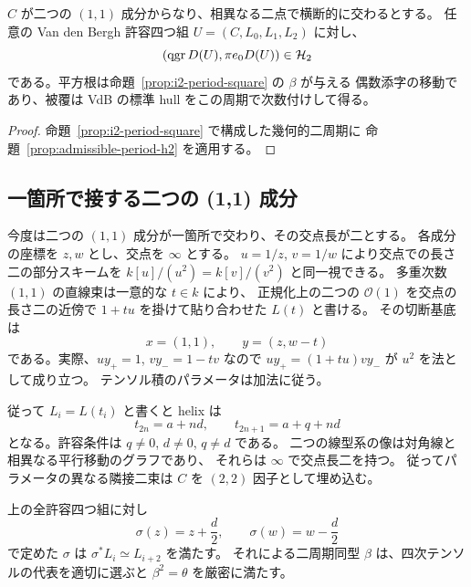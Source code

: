\begin{theorem}[横断的二成分境界での逆構成]
\label{thm:i2-inverse}
$C$ が二つの $(1,1)$ 成分からなり、相異なる二点で横断的に交わるとする。
任意の Van den Bergh 許容四つ組 $U=(C,L_0,L_1,L_2)$ に対し、
\[
  (\operatorname{qgr} D(U),\pi e_0D(U))\in\mathcal H_2
\]
である。平方根は命題~\ref{prop:i2-period-square} の $\beta$ が与える
偶数添字の移動であり、被覆は VdB の標準 hull をこの周期で次数付けして得る。
\end{theorem}

\begin{proof}
命題~\ref{prop:i2-period-square} で構成した幾何的二周期に
命題~\ref{prop:admissible-period-h2} を適用する。
\end{proof}

\subsection{一箇所で接する二つの (1,1) 成分}

今度は二つの $(1,1)$ 成分が一箇所で交わり、その交点長が二とする。
各成分の座標を $z,w$ とし、交点を $\infty$ とする。
$u=1/z$, $v=1/w$ により交点での長さ二の部分スキームを
$k[u]/(u^2)=k[v]/(v^2)$ と同一視できる。
多重次数 $(1,1)$ の直線束は一意的な $t\in k$ により、
正規化上の二つの $\mathcal O(1)$ を交点の長さ二の近傍で
$1+t u$ を掛けて貼り合わせた $L(t)$ と書ける。
その切断基底は
\[
 x=(1,1),\qquad y=(z,w-t)
\]
である。実際、$u y_+=1$, $v y_-=1-tv$ なので
$u y_+=(1+t u)v y_-$ が $u^2$ を法として成り立つ。
テンソル積のパラメータは加法に従う。

従って $L_i=L(t_i)$ と書くと helix は
\[
 t_{2n}=a+nd,\qquad t_{2n+1}=a+q+nd
\]
となる。許容条件は $q\ne0$, $d\ne0$, $q\ne d$ である。
二つの線型系の像は対角線と相異なる平行移動のグラフであり、
それらは $\infty$ で交点長二を持つ。
従ってパラメータの異なる隣接二束は $C$ を $(2,2)$ 因子として埋め込む。

\begin{proposition}[接する二成分での二周期の平方]
\label{prop:tacnode-period-square}
上の全許容四つ組に対し
\[
 \sigma(z)=z+\frac d2,\qquad \sigma(w)=w-\frac d2
\]
で定めた $\sigma$ は $\sigma^*L_i\simeq L_{i+2}$ を満たす。
それによる二周期同型 $\beta$ は、四次テンソルの代表を適切に選ぶと
$\beta^2=\theta$ を厳密に満たす。
\end{proposition}

